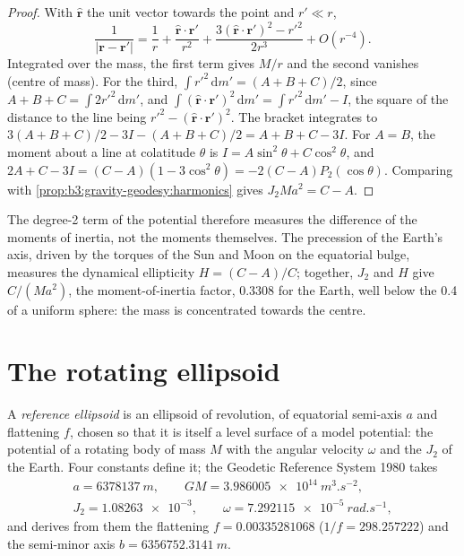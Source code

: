 \begin{proof}
With $\hat{\mathbf r}$ the unit vector towards the point and $r' \ll r$,
\[
  \frac{1}{|\mathbf r - \mathbf r'|} = \frac1r + \frac{\hat{\mathbf r}\cdot\mathbf r'}{r^2}
  + \frac{3(\hat{\mathbf r}\cdot\mathbf r')^2 - r'^2}{2r^3} + O(r^{-4}).
\]
Integrated over the mass, the first term gives $M/r$ and the second vanishes
(centre of mass). For the third, $\int r'^2\,\mathrm dm' = (A + B + C)/2$, since
$A + B + C = \int 2r'^2\,\mathrm dm'$, and $\int(\hat{\mathbf r}\cdot\mathbf
r')^2\,\mathrm dm' = \int r'^2\,\mathrm dm' - I$, the square of the distance to
the line being $r'^2 - (\hat{\mathbf r}\cdot\mathbf r')^2$. The bracket integrates
to $3(A + B + C)/2 - 3I - (A + B + C)/2 = A + B + C - 3I$. For $A = B$, the
moment about a line at colatitude $\theta$ is $I = A\sin^2\theta + C\cos^2\theta$,
and $2A + C - 3I = (C - A)(1 - 3\cos^2\theta) = -2(C - A)P_2(\cos\theta)$.
Comparing with \cref{prop:b3:gravity-geodesy:harmonics} gives
$J_2Ma^2 = C - A$.
\end{proof}

The degree-2 term of the potential therefore measures the difference of the
moments of inertia, not the moments themselves. The precession of the Earth's
axis, driven by the torques of the Sun and Moon on the equatorial bulge,
measures the dynamical ellipticity $H = (C - A)/C$; together, $J_2$ and $H$ give
$C/(Ma^2)$, the moment-of-inertia factor, \num{0.3308} for the Earth,
well below the \num{0.4} of a uniform sphere: the mass is concentrated towards
the centre.

\section{The rotating ellipsoid}

\begin{definition}\label{def:b3:gravity-geodesy:ellipsoid}
A \emph{reference ellipsoid} is an ellipsoid of
revolution, of equatorial semi-axis $a$ and flattening $f$, chosen so that it
is itself a level surface of a model potential: the potential of a rotating
body of mass $M$ with the angular velocity $\omega$ and the  $J_2$ of the Earth. Four constants define it; the Geodetic Reference
System 1980 takes
\begin{gather*}
  a = \qty{6378137}{m},\qquad GM = \qty{3.986005e14}{m^3.s^{-2}},\\
  J_2 = \num{1.08263e-3},\qquad \omega = \qty{7.292115e-5}{rad.s^{-1}},
\end{gather*}
and derives from them the flattening $f = \num{0.00335281068}$
($1/f = \num{298.257222}$) and the semi-minor axis
$b = \qty{6356752.3141}{m}$.
\end{definition}

